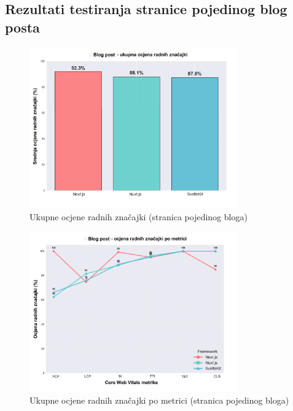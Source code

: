 
\subsection{Rezultati testiranja stranice pojedinog blog posta}

\begin{figure}[H]
    \centering
    \includegraphics[width=0.8\textwidth]{slike/rezultati/blog-post/blogPost_framework_overall_performance.png}
    \caption{Ukupne ocjene radnih značajki (stranica pojedinog bloga) }
    \label{fig:testiranje-blog-post-ukupne-performanse}
\end{figure}

\begin{figure}[H]
    \centering
    \includegraphics[width=0.8\textwidth]{slike/rezultati/blog-post/blogPost_performance_by_metric.png}
    \caption{Ukupne ocjene radnih značajki po metrici (stranica pojedinog bloga) }
    \label{fig:testiranje-blog-post-performanse-po-metrici}
\end{figure}


